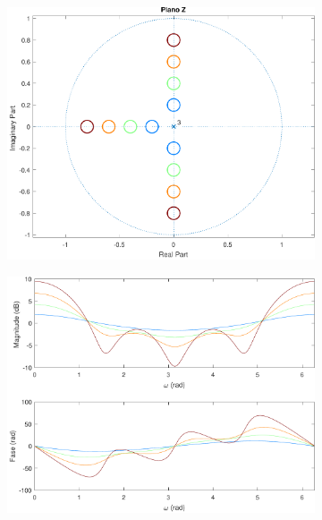 \documentclass[a4paper,11pt]{article}
\numberwithin{figure}{section}
\numberwithin{equation}{section}
\numberwithin{table}{section}
\theoremstyle{definition}
\begin{document}
\begin{figure}[ht]
	\centering
	\begin{subfigure}{0.44\textwidth}
		\includegraphics[width=\textwidth]{ex_2_pz_4}
	\end{subfigure}
	\begin{subfigure}{0.44\textwidth}
		\includegraphics[width=\textwidth]{ex_2_bode_4}
	\end{subfigure}\\
	\begin{subfigure}{0.44\textwidth}

\end{subfigure}
\end{figure}
\end{document}
